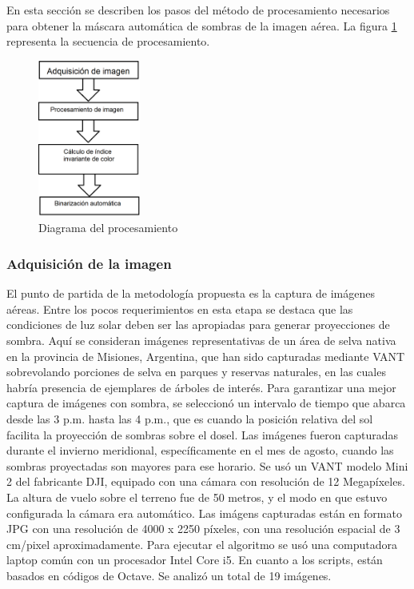 En esta sección se describen los pasos del método de procesamiento necesarios para obtener la máscara automática de sombras de la imagen aérea. La figura \ref{diagrama_procesamiento} representa la secuencia de procesamiento.

\begin{figure}
    \includegraphics[width=0.3\textwidth]{Imagenes/flowchart.png}
     \hfill
     \caption{Diagrama del procesamiento}
    \label{diagrama_procesamiento}
\end{figure}

\subsubsection{Adquisición de la imagen}
El punto de partida de la metodología propuesta es la captura de imágenes aéreas. Entre los pocos requerimientos en esta etapa se destaca que las condiciones de luz solar deben ser las apropiadas para generar proyecciones de sombra. Aquí se consideran imágenes representativas de un área de selva nativa en la provincia de Misiones, Argentina, que han sido capturadas mediante VANT sobrevolando porciones de selva en parques y reservas naturales, en las cuales habría presencia de ejemplares de árboles de interés. Para garantizar una mejor captura de imágenes con sombra, se seleccionó un intervalo de tiempo que abarca desde las 3 p.m. hasta las 4 p.m., que es cuando la posición relativa del sol facilita la proyección de sombras sobre el dosel. Las imágenes fueron capturadas durante el invierno meridional, específicamente en el mes de agosto, cuando las sombras proyectadas son mayores para ese horario. Se usó un VANT modelo Mini 2 del fabricante DJI, equipado con una cámara con resolución de 12 Megapíxeles. La altura de vuelo sobre el terreno fue de 50 metros, y el modo en que estuvo configurada la cámara era automático. Las imágens capturadas están en formato JPG con una resolución de 4000 x 2250 píxeles, con una resolución espacial de 3 cm/pixel aproximadamente. Para ejecutar el algoritmo se usó una computadora laptop común con un procesador Intel Core i5. En cuanto a los scripts, están basados en códigos de Octave. Se analizó un total de 19 imágenes.

